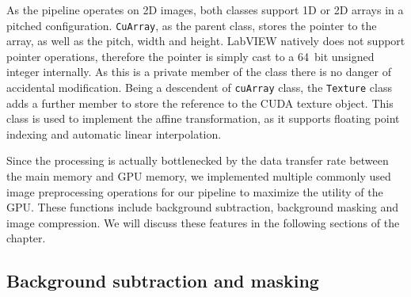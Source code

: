   As the pipeline operates on 2D images, both classes support 1D or 2D arrays in a pitched configuration. \texttt{CuArray}, as the parent class, stores the pointer to the array, as well as the pitch, width and height. LabVIEW natively does not support pointer operations, therefore the pointer is simply cast to a \SI{64}{bit} unsigned integer internally. As this is a private member of the class there is no danger of accidental modification. Being a descendent of \texttt{cuArray} class, the \texttt{Texture} class adds a further member to store the reference to the CUDA texture object. This class is used to implement the affine transformation, as it supports floating point indexing and automatic linear interpolation.

  Since the processing is actually bottlenecked by the data transfer rate between the main memory and GPU memory, we implemented multiple commonly used image preprocessing operations for our pipeline to maximize the utility of the GPU. These functions include background subtraction, background masking and image compression. We will discuss these features in the following sections of the chapter. 


  \subsection{Background subtraction and masking}
  
